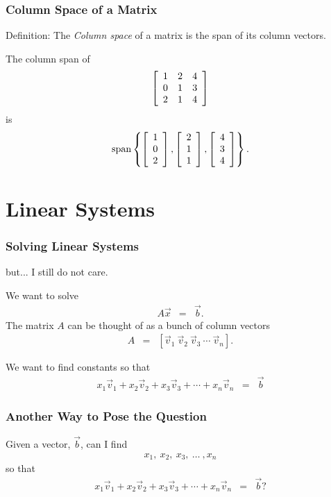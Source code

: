 \begin{frame}
  \frametitle{Column Space of a Matrix}

  Definition: The \textit{Column space} of a matrix is the span of its
  column vectors.

  {
    The column span of 
    \begin{eqnarray*}
      \left[ \begin{array}{rrr} 1 & 2 & 4 \\ 0 & 1 & 3 \\ 2 & 1 & 4 \end{array} \right]
    \end{eqnarray*}
    is 
    \begin{eqnarray*}
      \mathrm{span}\left\{
        \left[ \begin{array}{r} 1 \\ 0 \\ 2 \end{array} \right],\left[ \begin{array}{r} 2 \\ 1 \\ 1 \end{array} \right],\left[ \begin{array}{r} 4 \\ 3 \\ 4 \end{array} \right]\right\}.
    \end{eqnarray*}
  }

\end{frame}

\section{Linear Systems}

\begin{frame}
  \frametitle{Solving Linear Systems}

  but... I still do not care.

  We want to solve
  \begin{eqnarray*}
    A \vec{x} & = & \vec{b}.
  \end{eqnarray*}
  The matrix $A$ can be thought of as a bunch of column vectors
  \begin{eqnarray*}
    A & = & \left[ \vec{v}_1~\vec{v}_2~\vec{v}_3~\cdots~\vec{v}_n \right].
  \end{eqnarray*}

  We want to find constants so that
  \begin{eqnarray*}
    x_1 \vec{v}_1 + x_2 \vec{v}_2 + x_3 \vec{v}_3 + \cdots + x_n \vec{v}_n & = & \vec{b}
  \end{eqnarray*}


\end{frame}


\begin{frame}
  \frametitle{Another Way to Pose the Question}

  Given a vector, $\vec{b}$, can I find 
  \begin{eqnarray*}
    x_1,~x_2,~x_3,~\ldots~,x_n
  \end{eqnarray*}
  so that 
  \begin{eqnarray*}
    x_1 \vec{v}_1 + x_2 \vec{v}_2 + x_3 \vec{v}_3 + \cdots + x_n \vec{v}_n & = & \vec{b}?
  \end{eqnarray*}


\end{frame}


